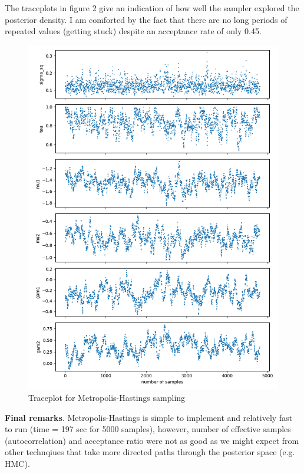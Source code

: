 \documentclass[12pt,letterpaper,twoside]{article}
\begin{document}
The traceplots in figure 2 give an indication of how well the sampler 
explored the posterior density. I am comforted by the fact that 
there are no long periods of repeated values (getting stuck) 
despite an acceptance rate of only 0.45.
\begin{figure}[H]
    \centering
    \includegraphics[scale=0.7]{mh_sampled_traceplot.png}
    \caption{Traceplot for Metropolis-Hastings sampling}
\end{figure}

\textbf{Final remarks}. Metropolis-Hastings is simple to implement 
and relatively fast to run (time = 197 sec for 5000 samples), however,
number of effective samples (autocorrelation) and acceptance ratio 
were not as good as we might expect from other technqiues that take 
more directed paths through the posterior space (e.g. HMC).   
\end{document}
